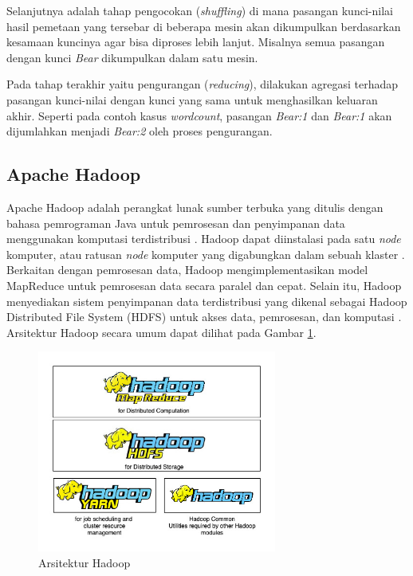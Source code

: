 Selanjutnya adalah tahap pengocokan (\textit{shuffling}) di mana pasangan kunci-nilai hasil pemetaan yang tersebar di beberapa mesin akan dikumpulkan berdasarkan kesamaan kuncinya agar bisa diproses lebih lanjut. Misalnya semua pasangan dengan kunci \textit{Bear} dikumpulkan dalam satu mesin.

Pada tahap terakhir yaitu pengurangan (\textit{reducing}), dilakukan agregasi terhadap pasangan kunci-nilai dengan kunci yang sama untuk menghasilkan keluaran akhir. Seperti pada contoh kasus \textit{wordcount}, pasangan \textit{Bear:1} dan \textit{Bear:1} akan dijumlahkan menjadi \textit{Bear:2} oleh proses pengurangan.

\subsection{Apache Hadoop}
Apache Hadoop adalah perangkat lunak sumber terbuka yang ditulis dengan bahasa pemrograman Java untuk pemrosesan dan penyimpanan data menggunakan komputasi terdistribusi \cite{ApacheHadoop}. Hadoop dapat diinstalasi pada satu \textit{node} komputer, atau ratusan \textit{node} komputer yang digabungkan dalam sebuah klaster \cite{maneasEvolutionHadoopDistributed2018}. Berkaitan dengan pemrosesan data, Hadoop mengimplementasikan model MapReduce untuk pemrosesan data secara paralel dan cepat. Selain itu, Hadoop menyediakan sistem penyimpanan data terdistribusi yang dikenal sebagai Hadoop Distributed File System (HDFS) untuk akses data, pemrosesan, dan komputasi \cite{dabasAnalysisCommentsYoutube2019}. Arsitektur Hadoop secara umum dapat dilihat pada Gambar \ref{fig:hadoop-str}.

\begin{figure}[h!]
    \centering
    \includegraphics[width=0.7\textwidth]{figures/ch02/hadoop-str}
    \caption{Arsitektur Hadoop}
    \label{fig:hadoop-str}
\end{figure}

